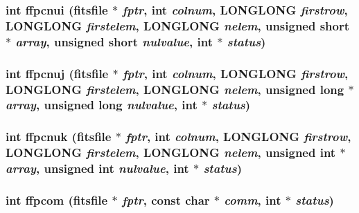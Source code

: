 \subsubsection{\setlength{\rightskip}{0pt plus 5cm}int ffpcnui (\bf{fitsfile} $\ast$ {\em fptr}, int {\em colnum}, \bf{LONGLONG} {\em firstrow}, \bf{LONGLONG} {\em firstelem}, \bf{LONGLONG} {\em nelem}, unsigned short $\ast$ {\em array}, unsigned short {\em nulvalue}, int $\ast$ {\em status})}\label{test_2shm__client_2fitsio_8h_8541e4ca79b0f019d82cd4c74944991d}


\subsubsection{\setlength{\rightskip}{0pt plus 5cm}int ffpcnuj (\bf{fitsfile} $\ast$ {\em fptr}, int {\em colnum}, \bf{LONGLONG} {\em firstrow}, \bf{LONGLONG} {\em firstelem}, \bf{LONGLONG} {\em nelem}, unsigned long $\ast$ {\em array}, unsigned long {\em nulvalue}, int $\ast$ {\em status})}\label{test_2shm__client_2fitsio_8h_4087fc2b72c74e0de0d5ed78f4f3170d}


\subsubsection{\setlength{\rightskip}{0pt plus 5cm}int ffpcnuk (\bf{fitsfile} $\ast$ {\em fptr}, int {\em colnum}, \bf{LONGLONG} {\em firstrow}, \bf{LONGLONG} {\em firstelem}, \bf{LONGLONG} {\em nelem}, unsigned int $\ast$ {\em array}, unsigned int {\em nulvalue}, int $\ast$ {\em status})}\label{test_2shm__client_2fitsio_8h_8369b2614c8c0b06dc09af47f1ce354d}


\subsubsection{\setlength{\rightskip}{0pt plus 5cm}int ffpcom (\bf{fitsfile} $\ast$ {\em fptr}, const char $\ast$ {\em comm}, int $\ast$ {\em status})}\label{test_2shm__client_2fitsio_8h_50c9a1cbd0f53a16f333f7436c3956eb}


